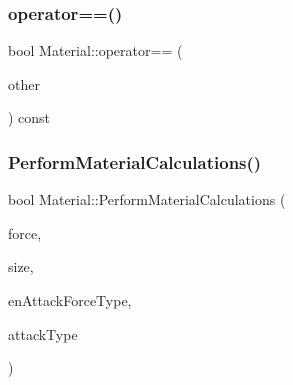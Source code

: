 \mbox{\label{class_material_acabed06a9ea9e7b8f56bd93785f81028}} 
\subsubsection{\texorpdfstring{operator==()}{operator==()}}
{\footnotesize\ttfamily bool Material\+::operator== (\begin{DoxyParamCaption}\item[{const \mbox{\hyperlink{class_material}{Material}} \&}]{other }\end{DoxyParamCaption}) const}

\mbox{\label{class_material_a9340d9854962d09d685b9638be093fa5}} 
\subsubsection{\texorpdfstring{Perform\+Material\+Calculations()}{PerformMaterialCalculations()}}
{\footnotesize\ttfamily bool Material\+::\+Perform\+Material\+Calculations (\begin{DoxyParamCaption}\item[{float}]{force,  }\item[{float}]{size,  }\item[{\mbox{\hyperlink{_enum_types_8hpp_ad893f9959c49f07fb713f13630b7ee2d}{Attack\+Force\+Type}}}]{en\+Attack\+Force\+Type,  }\item[{\mbox{\hyperlink{_enum_types_8hpp_a904b2f9c8f3951116c343784c59d6afe}{Attack\+Type}}}]{attack\+Type }\end{DoxyParamCaption})}

